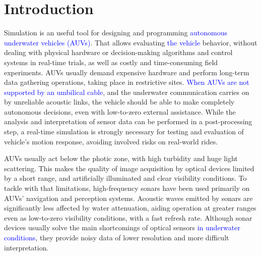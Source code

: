 \documentclass[final,5p,times]{elsarticle}
\begin{document}
\linenumbers

\section{Introduction}
\label{introduction}

Simulation is an useful tool for designing and programming \textcolor{blue}{autonomous underwater vehicles (AUVs)}. That allows evaluating \textcolor{blue}{the vehicle} behavior, without dealing with physical hardware or decision-making algorithms and control systems in real-time trials, as well as costly and time-consuming field experiments. AUVs usually demand expensive hardware and
perform long-term data gathering operations, taking place in restrictive
sites. \textcolor{blue}{When AUVs are not supported by an umbilical cable}, and the underwater communication carries on by unreliable acoustic links, the vehicle should be able to make completely autonomous decisions, even with low-to-zero external assistance.
While the analysis and interpretation of sensor data can be performed in a
post-processing step, a real-time simulation is strongly necessary for testing
and evaluation of vehicle's motion response, avoiding involved risks on
real-world rides.

AUVs usually act below the photic zone, with high turbidity and huge light
scattering. This makes the quality of image acquisition by optical devices
limited by a short range, and artificially illuminated and clear visibility
conditions. To tackle with that limitations, high-frequency sonars have been used
primarily on AUVs' navigation and perception systems. Acoustic waves emitted
by sonars are significantly less affected by water attenuation,
aiding operation at greater ranges even as low-to-zero visibility conditions,
with a fast refresh rate. Although sonar devices usually solve the main
shortcomings of optical sensors \textcolor{blue}{in underwater conditions}, they provide noisy data of lower resolution and more difficult interpretation.
\end{document}

